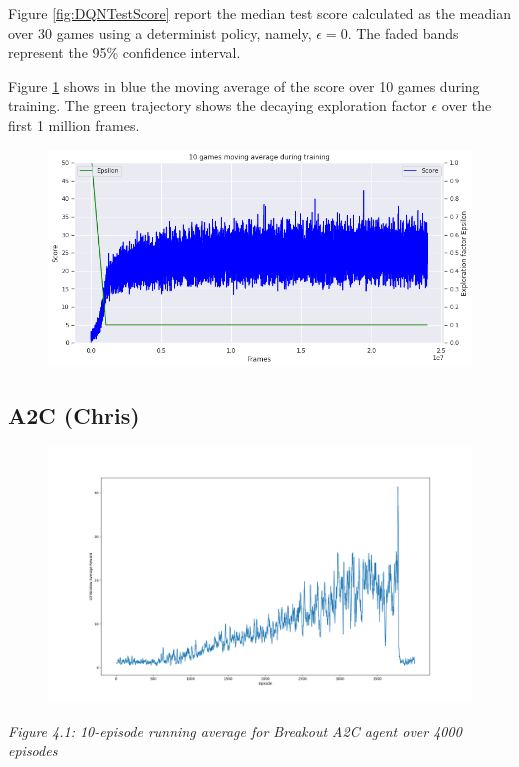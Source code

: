 \documentclass{article}
\begin{document}
Figure \ref{fig:DQNTestScore} report the median test score calculated as the meadian over 30 games using a determinist policy, namely, $\epsilon = 0$. The faded bands represent the 95\% confidence interval.

Figure \ref{fig:DQNMovAvg} shows in blue the moving average of the score over 10 games during training. The green trajectory shows the decaying exploration factor $\epsilon$ over the first 1 million frames. 

\begin{figure}[H]
\includegraphics[scale=0.5]{DQNMovAvgTraining.png}
\caption[width=0.7\textwidth]{}
\label{fig:DQNMovAvg}
\end{figure}

\subsection{A2C (Chris)}

\begin{figure}[h]
\includegraphics[scale=0.2]{A2C4000.png}
\end{figure}
\emph{Figure 4.1: 10-episode running average for Breakout A2C agent over 4000 episodes}
\end{document}
